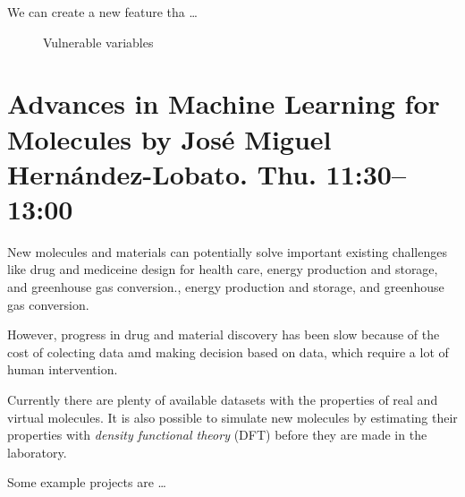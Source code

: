 \documentclass[b5paper]{report}
\begin{document}
We can create a new feature tha \dots

\begin{figure}[h]
  \centering
  \caption{Vulnerable variables}
\end{figure}

\chapter{Advances in Machine Learning for Molecules by José Miguel
Hernández-Lobato. Thu. 11:30--13:00}

New molecules and materials can potentially solve important existing challenges
like drug and mediceine design for health care, energy production and storage,
and greenhouse gas conversion., energy production and storage, and greenhouse
gas conversion.

However, progress in drug and material discovery has been slow because of the
cost of colecting data amd making decision based on data, which require a lot
of human intervention.

Currently there are plenty of available datasets with the properties of real
and virtual molecules. It is also possible to simulate new molecules by
estimating their properties with \emph{density functional theory} (DFT) before
they are made in the laboratory.

Some example projects are \dots
\end{document}
